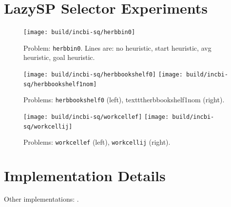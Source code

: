 \section{LazySP Selector Experiments}

\begin{figure}
   \centering
   \texttt{[image: build/incbi-sq/herbbin0]}
   \caption{Problem: \texttt{herbbin0}.
      Lines are:
      \protect{} no heuristic,
      \protect{} start heuristic,
      \protect{} avg heuristic,
      \protect{} goal heuristic.
      }
\end{figure}

\begin{figure}
   \centering
   \texttt{[image: build/incbi-sq/herbbookshelf0]}
   \texttt{[image: build/incbi-sq/herbbookshelf1nom]}
   \caption{Problems: \texttt{herbbookshelf0} (left), texttt{herbbookshelf1nom} (right).}
\end{figure}

\begin{figure}
   \centering
   \texttt{[image: build/incbi-sq/workcellef]}
   \texttt{[image: build/incbi-sq/workcellij]}
   \caption{Problems: \texttt{workcellef} (left), \texttt{workcellij} (right).}
\end{figure}

\section{Implementation Details}

Other implementations:
\citep{alberts1998softwaredynamicgraph}.
